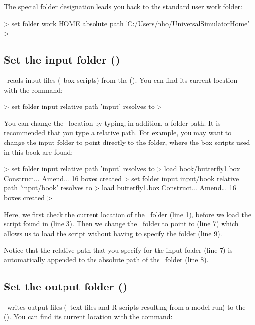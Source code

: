 The special folder designation  leads you back to the standard user work folder:

\begin{usdialog}
> set folder work HOME
absolute path 'C:/Users/nho/UniversalSimulatorHome'
> 
\end{usdialog}

\subsection{Set the input folder ()}
\US\ reads input files (\eg\ box scripts) from the  (). You can find its current location with the  command:

\begin{usdialog}
> set folder input
relative path 'input' resolves to %
> \end{usdialog}

You can change the \ location by typing, in addition, a folder path. It is recommended that you type a relative path. For example, you may want to change the input folder to point directly to the folder, where the box scripts used in this book are found:

\lstset{numbers=left}
\begin{usdialog}
> set folder input 
relative path 'input' resolves to %
> load book/butterfly1.box
Construct...
Amend...
16 boxes created
> set folder input input/book
relative path 'input/book' resolves to %
> load butterfly1.box
Construct...
Amend...
16 boxes created
> 
\end{usdialog}
\lstset{numbers=none}

Here, we first check the current location of the \ folder (line 1), before we load the  script found in  (line 3). Then we change the \ folder to point to  (line 7) which allows us to load the  script without having to specify the  folder (line 9).

Notice that the relative path that you specify for the input folder (line 7) is automatically appended to the absolute path of the \ushome\ folder (line 8).

\subsection{Set the output folder (\outputfolder)}
\US\ writes output files (\eg\ text files and R scripts resulting from a model run) to the  (\outputfolder). You can find its current location with the  command:

